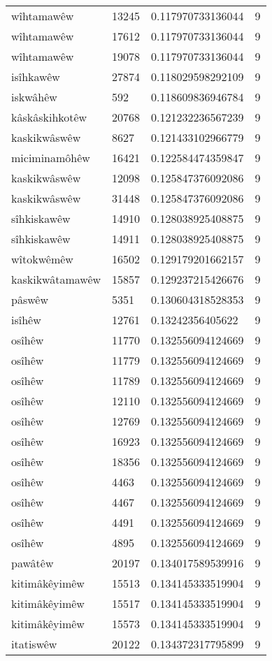 \begin{longtable}{llll}
wîhtamawêw & 13245 & 0.117970733136044 & 9\\
wîhtamawêw & 17612 & 0.117970733136044 & 9\\
wîhtamawêw & 19078 & 0.117970733136044 & 9\\
isîhkawêw & 27874 & 0.118029598292109 & 9\\
iskwâhêw & 592 & 0.118609836946784 & 9\\
kâskâskihkotêw & 20768 & 0.121232236567239 & 9\\
kaskikwâswêw & 8627 & 0.121433102966779 & 9\\
miciminamôhêw & 16421 & 0.122584474359847 & 9\\
kaskikwâswêw & 12098 & 0.125847376092086 & 9\\
kaskikwâswêw & 31448 & 0.125847376092086 & 9\\
sîhkiskawêw & 14910 & 0.128038925408875 & 9\\
sîhkiskawêw & 14911 & 0.128038925408875 & 9\\
wîtokwêmêw & 16502 & 0.129179201662157 & 9\\
kaskikwâtamawêw & 15857 & 0.129237215426676 & 9\\
pâswêw & 5351 & 0.130604318528353 & 9\\
isîhêw & 12761 & 0.13242356405622 & 9\\
osîhêw & 11770 & 0.132556094124669 & 9\\
osîhêw & 11779 & 0.132556094124669 & 9\\
osîhêw & 11789 & 0.132556094124669 & 9\\
osîhêw & 12110 & 0.132556094124669 & 9\\
osîhêw & 12769 & 0.132556094124669 & 9\\
osîhêw & 16923 & 0.132556094124669 & 9\\
osîhêw & 18356 & 0.132556094124669 & 9\\
osîhêw & 4463 & 0.132556094124669 & 9\\
osîhêw & 4467 & 0.132556094124669 & 9\\
osîhêw & 4491 & 0.132556094124669 & 9\\
osîhêw & 4895 & 0.132556094124669 & 9\\
pawâtêw & 20197 & 0.134017589539916 & 9\\
kitimâkêyimêw & 15513 & 0.134145333519904 & 9\\
kitimâkêyimêw & 15517 & 0.134145333519904 & 9\\
kitimâkêyimêw & 15573 & 0.134145333519904 & 9\\
itatiswêw & 20122 & 0.134372317795899 & 9\\

\end{longtable}
